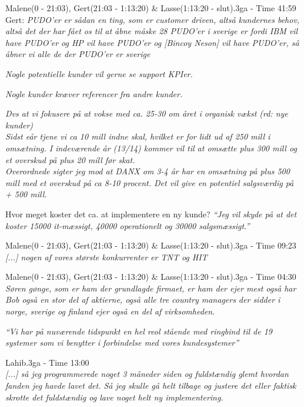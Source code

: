 \begin{thebibliography}{9}
	Malene(0 - 21:03), Gert(21:03 - 1:13:20) \& Lasse(1:13:20 - slut).3ga - Time 41:59\\
	Gert: \textit{PUDO’er er sådan en ting, som er customer driven, altså kundernes behov, altså det der har fået os til at åbne måske 28 PUDO’er i sverige er fordi IBM vil have PUDO’er og HP vil have PUDO’er og [Bincoy Neson] vil have PUDO’er, så åbner vi alle de der PUDO’er er sverige  }

	\textit{Nogle potentielle kunder vil gerne se support KPIer.}

	\textit{Nogle kunder kræver referencer fra andre kunder.}

	\textit{Dvs at vi fokusere på at vokse med ca. 25-30 om året i organisk vækst \emph{(rd: nye kunder)}}\\
\textit{Sidst eår tjene vi ca 10 mill indne skal, hvilket er for lidt ud af 250 mill i omsætning. I indeværende år (13/14) kommer vil til at omsætte plus 300 mill og et overskud på plus 20 mill før skat.}\\
\textit{Overordnede sigter jeg mod at DANX om 3-4 år har en omsætning på plus 500 mill med et overskud på ca 8-10 procent. Det vil give en potentiel salgsværdig på + 500 mill.}

	Hvor meget koster det ca. at implementere en ny kunde?
	\textit{“Jeg vil skyde på at det koster 15000 it-mæssigt, 40000 operationelt og 30000 salgsmæssigt.”}

	Malene(0 - 21:03), Gert(21:03 - 1:13:20) \& Lasse(1:13:20 - slut).3ga - Time 09:23\\
	\textit{[...] nogen af vores største konkurrenter er TNT og HIT}

	Malene(0 - 21:03), Gert(21:03 - 1:13:20) \& Lasse(1:13:20 - slut).3ga - Time 04:30
	\textit{Søren gønge, som er ham der grundlagde firmaet, er ham der ejer mest også har Bob også en stor del af aktierne, også alle tre country managers der sidder i norge, sverige og finland ejer også en del af virksomheden.}

	\textit{“Vi har på nuværende tidspunkt en hel reol stående med ringbind til de 19 systemer som vi benytter i forbindelse med vores kundesystemer”}

	Lahib.3ga - Time 13:00\\
	\textit{[...] så jeg programmerede noget 3 måneder siden og fuldstændig glemt hvordan fanden jeg havde lavet det. Så jeg skulle gå helt tilbage og justere det eller faktisk skrotte det fuldstændig og lave noget helt ny implementering.}


\end{thebibliography}
